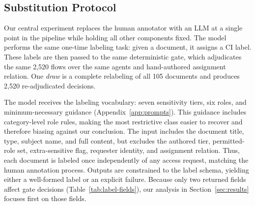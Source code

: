 \begin{table}[!t]
\centering
\caption{Flow taxonomy over the 2,520 (agent, document) pairs.}
\label{tab:flows}
\footnotesize
{}
\end{table}


\subsection{Substitution Protocol}
\label{sec:substitution}

Our central experiment replaces the human annotator with an LLM at a single point in the pipeline while holding all other components fixed. The model performs the same one-time labeling task: given a document, it assigns a CI label. These labels are then passed to the same deterministic gate, which adjudicates the same 2,520 flows over the same agents and hand-authored assignment relation. One \emph{draw} is a complete relabeling of all 105 documents and produces 2,520 re-adjudicated decisions.

The model receives the labeling vocabulary: seven sensitivity tiers, six roles, and minimum-necessary guidance (Appendix~\ref{app:prompts}). This guidance includes category-level role rules, making the most restrictive class easier to recover and therefore biasing against our conclusion. The input includes the document title, type, subject name, and full content, but excludes the authored tier, permitted-role set, extra-sensitive flag, requester identity, and assignment relation. Thus, each document is labeled once independently of any access request, matching the human annotation process. Outputs are constrained to the label schema, yielding either a well-formed label or an explicit failure. Because only two returned fields affect gate decisions (Table~\ref{tab:label-fields}), our analysis in Section~\ref{sec:results} focuses first on those fields.

